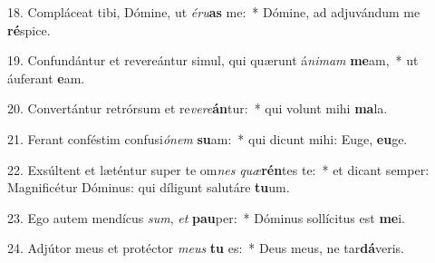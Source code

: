 18. Compláceat tibi, Dómine, ut \textit{é}\textit{ru}\textbf{as} me:~*  Dómine, ad adjuvándum me \textbf{ré}spice.\

19. Confundántur et revereántur simul, qui quærunt á\textit{ni}\textit{mam} \textbf{me}am,~*  ut áuferant \textbf{e}am.\

20. Convertántur retrórsum et re\textit{ve}\textit{re}\textbf{án}tur:~*  qui volunt mihi \textbf{ma}la.\

21. Ferant conféstim confusi\textit{ó}\textit{nem} \textbf{su}am:~*  qui dicunt mihi: Euge, \textbf{eu}ge.\

22. Exsúltent et læténtur super te om\textit{nes} \textit{quæ}\textbf{rén}tes te:~*  et dicant semper: Magnificétur Dóminus: qui díligunt salutáre \textbf{tu}um.\

23. Ego autem mendícus \textit{sum}, \textit{et} \textbf{pau}per:~*  Dóminus sollícitus est \textbf{me}i.\

24. Adjútor meus et protéctor \textit{me}\textit{us} \textbf{tu} es:~*  Deus meus, ne tar\textbf{dá}veris.\

